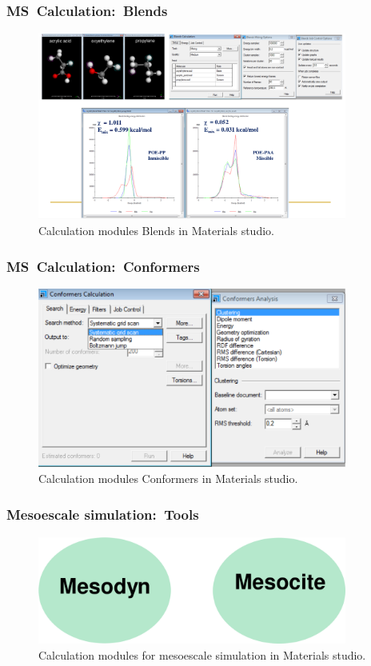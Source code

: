\frame
{
	\frametitle{\textrm{MS~Calculation:~Blends}}
\begin{figure}[h!]
\centering
\vspace*{-0.14in}
\includegraphics[height=2.43in,width=4.00in,viewport=0 0 1358 822,clip]{Figures/MS-Caluculator_Blends-example.png}
\caption{\tiny \textrm{Calculation modules Blends in Materials studio.}}%
\label{MS-Blends}
\end{figure}
}

\frame
{
	\frametitle{\textrm{MS~Calculation:~Conformers}}
\begin{figure}[h!]
\centering
\vspace*{-0.14in}
\includegraphics[height=2.33in,width=4.00in,viewport=0 0 1278 743,clip]{Figures/MS-Caluculator_Conformers-parameter.png}
\caption{\tiny \textrm{Calculation modules Conformers in Materials studio.}}%
\label{MS-Conformer}
\end{figure}
}

\frame
{
	\frametitle{\textrm{Mesoescale simulation:~Tools}}
\begin{figure}[h!]
\centering
\includegraphics[height=1.40in,width=4.00in,viewport=0 0 1391 482,clip]{Figures/MS-Mesoescale_simulation-tools.png}
\caption{\tiny \textrm{Calculation modules for mesoescale simulation in Materials studio.}}%
\label{MS-Mesoescale_simulation-}
\end{figure}
}

